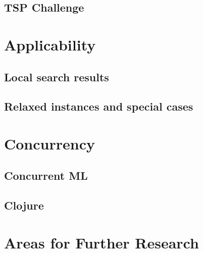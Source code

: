 \documentclass[10pt,a4paper]{scrartcl}
\begin{document}
\subsection{TSP Challenge}
\section{Applicability}
\subsection{Local search results}
\subsection{Relaxed instances and special cases}
\section{Concurrency}
\subsection{Concurrent ML}
\subsection{Clojure}
\section{Areas for Further Research}
%

\clearpage
\begin{appendices}
%
\end{appendices}

\printbibliography%
\end{document}
